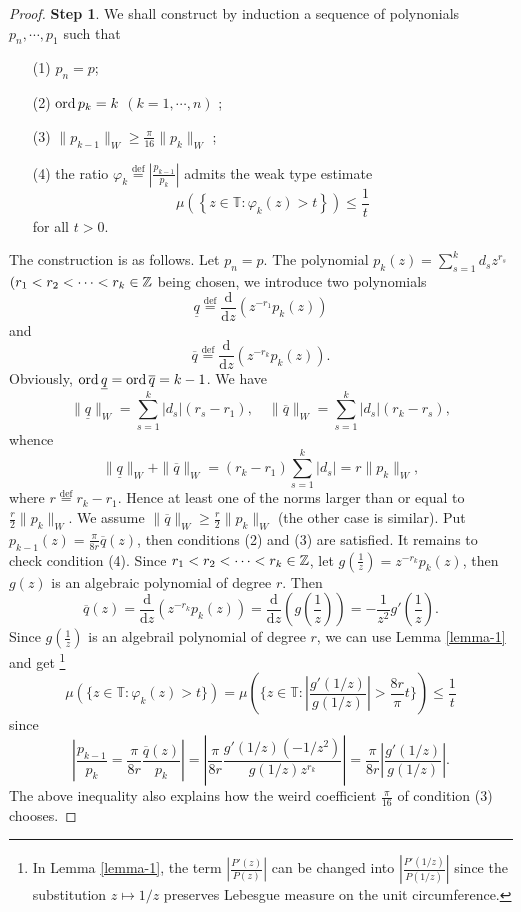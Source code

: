\begin{proof}
 
  \textbf{Step 1}. We shall construct by induction a sequence of polynonials $p_n,\cdots,p_1$ such that
  \begin{itemize}
    \item [(1)] $p_n=p$;
    \item [(2)]  $\operatorname{ord} p_k=k$ $ (k=1,\cdots,n)$ ;
    \item [(3)] $\|p_{k-1}\|_{W}\ge \frac{\pi}{16}\|p_k\|_{W}$ ;
    \item [(4)] the ratio $\varphi_k\overset{\mathrm{def}}{=}\left| \frac{p_{k-1}}{p_k} \right| $ admits the weak type estimate $$\mu\left( \left\{z\in \mathbb{T}:\varphi_k(z)>t\right\} \right)\le \frac{1}{t} $$ for all $t>0$.
  \end{itemize}
  The construction is as follows. Let $p_n=p$. The polynomial $p_k(z)=\sum_{s=1}^{k}d_sz^{r_s}$ $(r_1<r_2<\cdots<r_k\in \mathbb{Z}$ being chosen, we introduce two polynomials
  \[
    \underline{q}\overset{\mathrm{def}}{=} \frac{\mathrm{d}}{\mathrm{d}z}\left( z^{-r_1}p_k(z) \right) 		  
  \] 
  and
  \[
    \overline{q}\overset{\mathrm{def}}{=} \frac{\mathrm{d}}{\mathrm{d}z}\left( z^{-r_k}p_k(z) \right). 
  \] 
  Obviously, $\operatorname{ord} \underline{q}=\operatorname{ord} \overline{q}=k-1$. We have 
  \[
    \|\underline{q}\|_{W}=\sum_{s=1}^{k} \left| d_s \right| \left( r_s-r_1 \right) ,\quad \|\overline{q}\|_{W}=\sum_{s=1}^{k} \left| d_s \right| \left( r_k-r_s \right), 
  \] 
  whence
  \[
    \|\underline{q}\|_{W}+\|\overline{q}\|_{W}=\left( r_k-r_1 \right) \sum_{s=1}^{k} \left| d_s \right| =r\|p_k\|_{W},
  \] 
  where $r\overset{\mathrm{def}}{=}r_k-r_1$. Hence at least one of the norms larger than or equal to $\frac{r}{2}\|p_k\|_{W}$. We assume $\|\overline{q}\|_{W}\ge \frac{r}{2}\|p_k\|_{W}$ (the other case is similar). Put $p_{k-1}(z)=\frac{\pi}{8r}\overline{q}(z)$, then conditions (2) and (3) are satisfied. It remains to check condition (4). Since $r_1<r_2<\cdots<r_k\in \mathbb{Z}$, let $g(\frac{1}{z})=z^{-r_k}p_k(z)$, then $g(z)$ is an algebraic polynomial of degree $r$. Then
   \[
     \overline{q}(z)= \frac{\mathrm{d}}{\mathrm{d}z}\left( z^{-r_k}p_k(z) \right) = \frac{\mathrm{d}}{\mathrm{d}z}\left( g\left( \frac{1}{z} \right)  \right)=-\frac{1}{z^2}g'\left( \frac{1}{z} \right).	
\] 
Since $g\left( \frac{1}{z} \right) $ is an algebrail polynomial of degree $r$, we can use  Lemma \ref{lemma-1} and get \footnote{In Lemma \ref{lemma-1}, the term $\left| \frac{P'(z)}{P(z)} \right|$ can be changed into $\left| \frac{P'(1 /z)}{P(1 /z)} \right| $ since the substitution $z\mapsto 1 /z$ preserves Lebesgue measure on the unit circumference.  }
\begin{equation*}
    \mu \left( \{z\in \mathbb{T}:\varphi_{k}(z)>t\}  \right) = \mu \left( \{z\in \mathbb{T}:\left| \frac{g'(1 /z)}{g(1 /z)} \right| >\frac{8r}{\pi}t\}  \right) \le \frac{1}{t} 
\end{equation*} 
since 
$$\left|\frac{p_{k-1}}{p_k}=\frac{\pi}{8r} \frac{\overline{q}(z)}{p_k}\right|=\left|\frac{\pi}{8r} \frac{g'(1 /z)(-1 /z^2)}{g(1 /z)z^{r_k}}\right|=\frac{\pi}{8r}\left| \frac{g'(1 /z)}{g(1 /z)} \right|. 
$$
The above inequality also explains how the weird coefficient $\frac{\pi}{16}$ of condition (3) chooses.


\end{proof}

